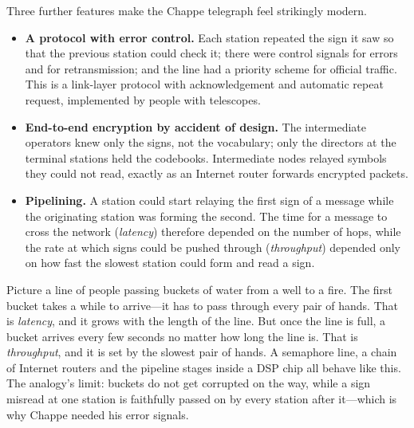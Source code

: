 Three further features make the Chappe telegraph feel strikingly modern.
\begin{itemize}
\item \textbf{A protocol with error control.} Each station repeated the sign it saw so that
the previous station could check it; there were control signals for errors and for
retransmission; and the line had a priority scheme for official traffic. This is a link-layer
protocol with acknowledgement and automatic repeat request, implemented by people with
telescopes.
\item \textbf{End-to-end encryption by accident of design.} The intermediate operators knew
only the signs, not the vocabulary; only the directors at the terminal stations held the
codebooks. Intermediate nodes relayed symbols they could not read, exactly as an Internet
router forwards encrypted packets.
\item \textbf{Pipelining.} A station could start relaying the first sign of a message while the
originating station was forming the second. The time for a message to cross the network
(\emph{latency}) therefore depended on the number of hops, while the rate at which signs could be
pushed through (\emph{throughput}) depended only on how fast the slowest station could form and
read a sign.
\end{itemize}

\begin{analogy}
Picture a line of people passing buckets of water from a well to a fire. The first bucket takes a
while to arrive---it has to pass through every pair of hands. That is \emph{latency}, and it grows
with the length of the line. But once the line is full, a bucket arrives every few seconds no matter
how long the line is. That is \emph{throughput}, and it is set by the slowest pair of hands. A
semaphore line, a chain of Internet routers and the pipeline stages inside a DSP chip all behave
like this. The analogy's limit: buckets do not get corrupted on the way, while a sign misread at one
station is faithfully passed on by every station after it---which is why Chappe needed his error
signals.
\end{analogy}

